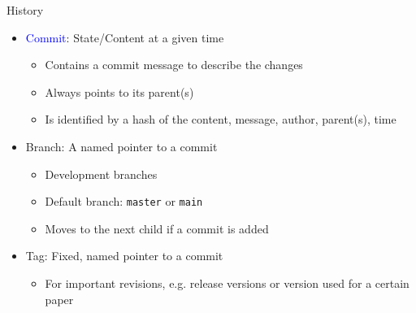\begin{frame}{History}

  \begin{itemize}
    \item<1-> \textcolor{blue}{Commit}: State/Content at a given time
      \begin{itemize}
        \item Contains a commit message to describe the changes
        \item Always points to its parent(s)
        \item Is identified by a hash of the content, message, author, parent(s), time
      \end{itemize}
    \item<2-> \textcolor{vertexDarkRed}{Branch}: A named pointer to a commit
      \begin{itemize}
        \item Development branches
        \item Default branch: \texttt{master} or \texttt{main}
        \item Moves to the next child if a commit is added
      \end{itemize}
    \item<4-> \textcolor{green!60!black}{Tag}: Fixed, named pointer to a commit
      \begin{itemize}
        \item For important revisions, e.g. release versions or version used for a certain paper
      \end{itemize}
  \end{itemize}
\end{frame}

